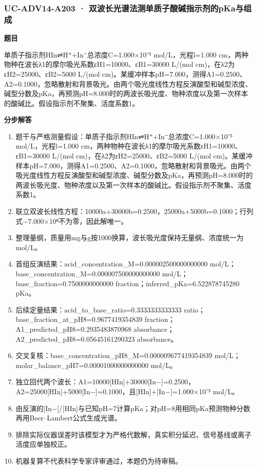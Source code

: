 \documentclass[UTF8,11pt,a4paper]{ctexart}
\begin{document}
\subsubsection*{UC-ADV14-A203 · 双波长光谱法测单质子酸碱指示剂的pKa与组成}
\noindent\textbf{题目}\par
单质子指示剂HIn⇌H⁺+In⁻总浓度C=1.000×10⁻⁵ mol/L，光程l=1.000 cm，两种物种在波长λ1的摩尔吸光系数εH1=10000、εB1=30000 L/(mol cm)，在λ2为εH2=25000、εB2=5000 L/(mol cm)。某缓冲样本pH=7.000，测得A1=0.2500、A2=0.1000，忽略散射和背景吸光。由两个吸光度线性方程反演酸型和碱型浓度、碱型分数及pKa，再预测pH=8.000时的两波长吸光度、物种浓度以及第一次样本的酸碱比。假设指示剂不聚集、活度系数1。\par
\medskip\noindent\textbf{分步解答}
\begin{enumerate}
\item 题干与严格测量假设：单质子指示剂HIn⇌H⁺+In⁻总浓度C=1.000×10⁻⁵ mol/L，光程l=1.000 cm，两种物种在波长λ1的摩尔吸光系数εH1=10000、εB1=30000 L/(mol cm)，在λ2为εH2=25000、εB2=5000 L/(mol cm)。某缓冲样本pH=7.000，测得A1=0.2500、A2=0.1000，忽略散射和背景吸光。由两个吸光度线性方程反演酸型和碱型浓度、碱型分数及pKa，再预测pH=8.000时的两波长吸光度、物种浓度以及第一次样本的酸碱比。假设指示剂不聚集、活度系数1。
\item 联立双波长线性方程：10000a+30000b=0.2500，25000a+5000b=0.1000；行列式−7.000×10⁸不为零，因此解唯一。
\item 整理量纲，质量用mg与g按1000换算，波长吸光度保持无量纲、浓度统一为mol/L。
\item 首组反演结果：acid\_concentration\_M=0.000002500000000000 mol/L；base\_concentration\_M=0.000007500000000000 mol/L；base\_fraction=0.7500000000000 fraction；inferred\_pKa=6.522878745280 pKa。
\item 后续定量结果：acid\_to\_base\_ratio=0.3333333333333 ratio；base\_fraction\_at\_pH8=0.9677419354839 fraction；A1\_predicted\_pH8=0.2935483870968 absorbance；A2\_predicted\_pH8=0.05645161290323 absorbance。
\item 交叉复核：base\_concentration\_pH8\_M=0.000009677419354839 mol/L；molar\_balance\_pH7=0.00001000000000000 mol/L。
\item 独立回代两个波长：A1=10000[HIn]+30000[In−]=0.2500，A2=25000[HIn]+5000[In−]=0.1000，且[HIn]+[In−]=1.000×10⁻⁵ mol/L。
\item 由反演的[In−]/[HIn]与已知pH=7计算pKa；对pH=8用相同pKa预测物种分数再用Beer–Lambert公式生成光谱。
\item 排除实际仪器误差时该模型才为严格代数解，真实积分延迟、信号基线或离子活度应单独校正。
\item 机器复算不代表科学专家评审通过，本题仍为待审稿。
\end{enumerate}
\end{document}
